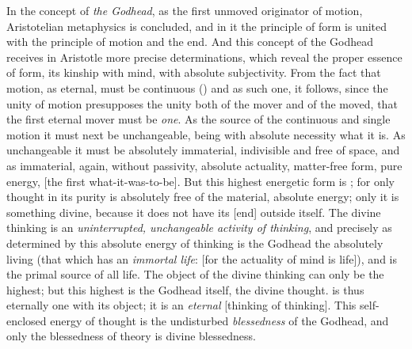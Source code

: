 In the concept of \emph{the Godhead}, as the first unmoved originator of motion, Aristotelian metaphysics is concluded, and in it
the principle of form is united with the principle of motion and the end.
And this concept of the Godhead receives in Aristotle more precise determinations, which reveal the proper essence of form,
its kinship with mind, with absolute subjectivity.
From the fact that motion, as eternal, must be continuous ()
and as such one, it follows, since the unity of motion presupposes the unity both of the mover and of the moved, that
the first eternal mover must be \emph{one}. As the source of the
continuous and single motion it must next be unchangeable, being with absolute necessity what it is. As unchangeable it must be absolutely immaterial, indivisible and free of space, and as immaterial, again, without passivity, absolute actuality, matter-free form, pure energy,  [the first what-it-was-to-be].
But this highest energetic form is ; for only thought
in its purity is absolutely free of the material, absolute energy;
only it is something divine, because it does not have its  [end]
outside itself. The divine thinking is an \emph{uninterrupted,
unchangeable activity of thinking}, and precisely as determined by this absolute energy of thinking is the Godhead
the absolutely living (that which has an \emph{immortal life}:  [for the actuality of mind is life]), and is the primal source of all life. The object of the divine thinking can only be the highest; but
this highest is the Godhead itself, the divine thought.
 is thus eternally one with its object; it is an \emph{eternal}
 [thinking of thinking]. This self-enclosed energy of thought
is the undisturbed \emph{blessedness} of the Godhead, and only the blessedness of theory is divine blessedness.

